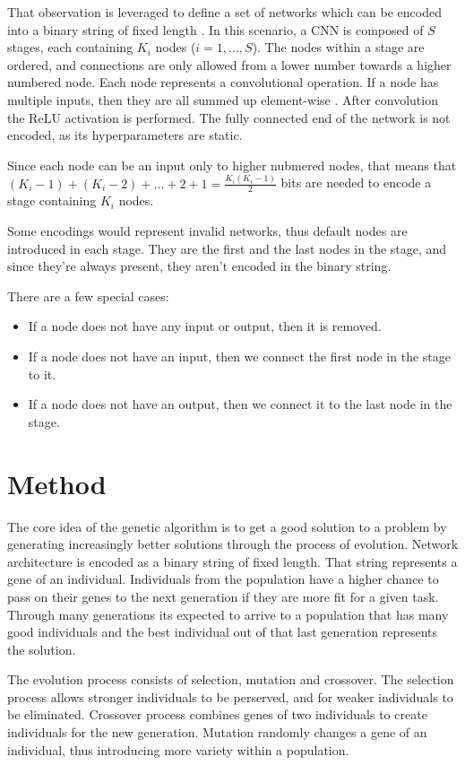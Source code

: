 \documentclass[eng]{simposium}
\begin{document}
That observation is leveraged to define a set of networks which 
can be encoded into a binary string of fixed length \cite{4}.
In this scenario, a CNN is composed of $S$ stages, each containing 
$K_i$ nodes ($i=1,...,S$). 
The nodes within a stage are ordered, and connections are only allowed from a lower number towards a higher numbered node.
Each node represents a convolutional operation. If a node has multiple inputs, then they are all summed up element-wise \cite{4}.
After convolution the ReLU activation is performed. 
The fully connected end of the network is not encoded, as its hyperparameters are static.

Since each node can be an input only to higher nubmered nodes, that means that 
$(K_i -1) + (K_i - 2) + ... + 2 + 1 = \frac{K_i(K_i-1)}{2} $ bits are needed to encode a stage containing $K_i$ nodes.

Some encodings would represent invalid networks, thus default nodes are introduced in each stage.
They are the first and the last nodes in the stage, and since they're always present, they aren't encoded in the binary string.

There are a few special cases:
\begin{itemize}
    \item If a node does not have any input or output, then it is removed.
    \item If a node does not have an input, then we connect the first node in the stage to it.
    \item If a node does not have an output, then we connect it to the last node in the stage.
\end{itemize}

\section{Method}

The core idea of the genetic algorithm is to get a good solution to a problem by generating increasingly better solutions through the process of evolution.
Network architecture is encoded as a binary string of fixed length. That string represents a gene of an individual.
Individuals from the population have a higher chance to pass on their genes to the next generation if they are more fit for a given task.
Through many generations its expected to arrive to a population that has many good individuals and the best individual out of that last generation represents the solution.

The evolution process consists of selection, mutation and crossover. 
The selection process allows stronger individuals to be perserved, and for weaker individuals to be eliminated.
Crossover process combines genes of two individuals to create individuals for the new generation.
Mutation randomly changes a gene of an individual, thus introducing more variety within a population.
\end{document}
